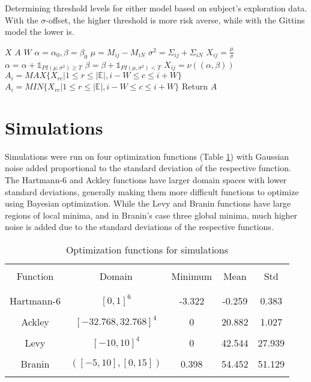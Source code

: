 \begin{algorithm}[t]
\caption{Determining threshold levels for either model based on subject's exploration data. With the $\sigma$-offset, the higher threshold is more risk averse, while with the Gittins model the lower is.}
\label{alg:adapthresh}
\begin{algorithmic}
\State {} $X$
\State {} $A$
\State {} $W$
  \State $\alpha = \alpha_0, \beta = \beta_0$
    \State $\mu = M_{ij} - M_{iN}$
    \State $\sigma^2 = \Sigma_{ij} + \Sigma_{iN}$
      \State $X_{ij} = \frac{\mu}{\sigma}$
    \EndIf
      \State $\alpha = \alpha + \mathbb{1}_{PI(\mu, \sigma^2) \geq T}$
      \State $\beta = \beta + \mathbb{1}_{PI(\mu, \sigma^2) < T}$
      \State $X_{ij} = \nu((\alpha, \beta))$
    \EndIf
  \End
\End
{}
    \State $A_{i} = MAX\{X_{rc}\vert 1 \leq r \leq \vert\mathbb{E}\vert, i-W \leq c \leq i+W\}$
  \EndIf
    \State $A_{i} = MIN\{X_{rc}\vert 1 \leq r \leq \vert\mathbb{E}\vert, i-W \leq c \leq i+W\}$
  \EndIf
\End
\State Return $A$
\end{algorithmic}
\end{algorithm}

\section{Simulations}
Simulations were run on four optimization functions (Table \ref{tab:optfunc}) with Gaussian noise added proportional to the standard deviation of the respective function. The Hartmann-6 and Ackley functions have larger domain spaces with lower standard deviations, generally making them more difficult functions to optimize using Bayesian optimization. While the Levy and Branin functions have large regions of local minima, and in Branin's case three global minima, much higher noise is added due to the standard deviations of the respective functions.

\begin{table}[t]
\centering
\begin{tabular}{ |c | c | c | c | c | }
  \hline&&&&\\
  Function & Domain & Minimum & Mean & Std\\
  &&&&\\
  \hline
  &&&&\\
  Hartmann-6 & $[0,1]^6$ & -3.322 & -0.259 & 0.383\\
  &&&&\\
  Ackley & $[-32.768, 32.768]^4$ & 0 & 20.882 & 1.027\\
  &&&&\\
  Levy & $[-10, 10]^4$ & 0 & 42.544 & 27.939\\
  &&&&\\
  Branin & $([-5, 10],[0, 15])$ & 0.398 & 54.452 & 51.129\\
  &&&&\\
  \hline
\end{tabular}
\caption{Optimization functions for simulations}
\label{tab:optfunc}
\end{table}

